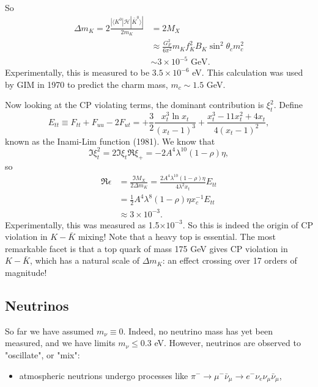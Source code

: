 So 
\begin{equation}
\begin{split}
\Delta m_K = 2\frac{|\langle K^0|\mathcal{H}|\bar{K}^0\rangle |}{2m_K}&= 2M_X \\ &\approx \frac{G_F^2}{6\pi^2}m_K f_K^2 B_K\sin^2\theta_c m_c^2 \\
&\sim 3\times 10^{-5} \text{ GeV}.
\end{split}
\end{equation}
Experimentally, this is measured to be $3.5 \times 10^{-6}$ eV. This calculation was used by GIM in 1970 to predict the charm mass, $m_c \sim 1.5$ GeV. 

Now looking at the CP violating terms, the dominant contribution is $\xi_t^2$. Define
\begin{equation}
E_{tt} \equiv F_{tt} + F_{uu} - 2F_{ut} = + \frac{3}{2} \frac{x_t^3 \ln x_t}{(x_t-1)^3} + \frac{x_t^3 - 11x_t^2 + 4x_t}{4(x_t-1)^2},
\end{equation}
known as the Inami-Lim function (1981). We know that
\begin{equation}
\Im \xi_t^2 = 2\Im \xi_t \Re \xi_+ = -2A^4 \lambda^{10}(1-\rho)\eta,
\end{equation}
so
\begin{equation}
\begin{split}
\Re \epsilon &= \frac{\Im M_X}{2 \Delta m_K} = \frac{2 A^4 \lambda^{10}(1-\rho)\eta}{4\lambda^2 x_t} E_{tt}\\
&= \frac{1}{2} A^4 \lambda^8 (1-\rho) \eta x_c^{-1} E_{tt} \\
&\approx 3\times 10^{-3}.
\end{split}
\end{equation}
Experimentally, this was measured as 1.5$\times 10^{-3}$. So this is indeed the origin of CP violation in $K-\bar{K}$ mixing! Note that a heavy top is essential. The most remarkable facet is that a top quark of mass 175 GeV gives CP violation in $K-\bar{K}$, which has a natural scale of $\Delta m_K$: an effect crossing over 17 orders of magnitude!
%
\subsection{Neutrinos}
%
So far we have assumed $m_\nu \equiv 0$. Indeed, no neutrino mass has yet been measured, and we have limits $m_\nu \leq 0.3$ eV. However, neutrinos are observed to "oscillate", or "mix":
\begin{itemize}
\item atmospheric neutrions undergo processes like $\pi^- \to \mu^- \bar{\nu}_\mu \to e^- \nu_e \nu_\mu \bar{\nu}_\mu$, 
\end{itemize}